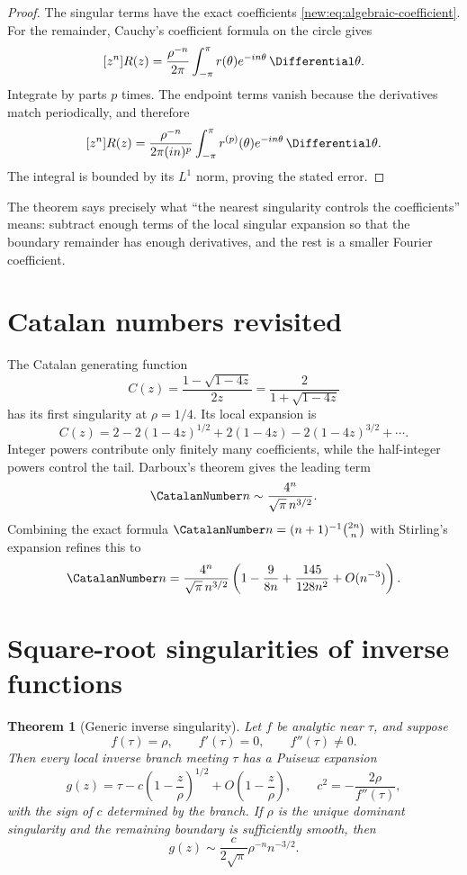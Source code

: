 \documentclass[11pt,a4paper,oneside,openany]{book}
\newtheorem{theorem}{Theorem}[chapter]
\theoremstyle{definition}
\theoremstyle{remark}
\begin{document}
\begin{proof}
The singular terms have the exact coefficients
\eqref{new:eq:algebraic-coefficient}.  For the remainder, Cauchy's coefficient
formula on the circle gives
\[
 [z^n]R(z)=\frac{\rho^{-n}}{2\pi}
 \int_{-\pi}^{\pi}r(\theta)e^{-in\theta}\,\Differential\theta.
\]
Integrate by parts $p$ times.  The endpoint terms vanish because the derivatives
match periodically, and therefore
\[
 [z^n]R(z)=\frac{\rho^{-n}}{2\pi(in)^p}
 \int_{-\pi}^{\pi}r^{(p)}(\theta)e^{-in\theta}\,\Differential\theta.
\]
The integral is bounded by its $L^1$ norm, proving the stated error.
\end{proof}

The theorem says precisely what ``the nearest singularity controls the
coefficients'' means: subtract enough terms of the local singular expansion so
that the boundary remainder has enough derivatives, and the rest is a smaller
Fourier coefficient.

\section{Catalan numbers revisited}

The Catalan generating function
\[
 C(z)=\frac{1-\sqrt{1-4z}}{2z}=\frac{2}{1+\sqrt{1-4z}}
\]
has its first singularity at $\rho=1/4$.  Its local expansion is
\[
 C(z)=2-2(1-4z)^{1/2}+2(1-4z)-2(1-4z)^{3/2}+\cdots.
\]
Integer powers contribute only finitely many coefficients, while the
half-integer powers control the tail.  Darboux's theorem gives the leading term
\[
 \CatalanNumber n\sim\frac{4^n}{\sqrt\pi\,n^{3/2}}.
\]
Combining the exact formula $\CatalanNumber n=(n+1)^{-1}\binom{2n}{n}$ with Stirling's
expansion refines this to
\begin{equation}
 \CatalanNumber n=\frac{4^n}{\sqrt\pi\,n^{3/2}}
 \left(1-\frac9{8n}+\frac{145}{128n^2}+O(n^{-3})\right).
 \label{new:eq:catalan-full-asymptotic}
\end{equation}

\section{Square-root singularities of inverse functions}

\begin{theorem}[Generic inverse singularity]
Let $f$ be analytic near $\tau$, and suppose
\[
 f(\tau)=\rho,\qquad f'(\tau)=0,\qquad f''(\tau)\ne0.
\]
Then every local inverse branch meeting $\tau$ has a Puiseux expansion
\begin{equation}
 g(z)=\tau-c\left(1-\frac z\rho\right)^{1/2}
       +O\left(1-\frac z\rho\right),
 \qquad
 c^2=-\frac{2\rho}{f''(\tau)},
 \label{new:eq:inverse-square-root}
\end{equation}
with the sign of $c$ determined by the branch.  If $\rho$ is the unique
dominant singularity and the remaining boundary is sufficiently smooth, then
\begin{equation}
 [z^n]g(z)\sim
 \frac{c}{2\sqrt\pi}\rho^{-n}n^{-3/2}.
 \label{new:eq:inverse-square-root-coefficient}
\end{equation}
\end{theorem}
\end{document}
